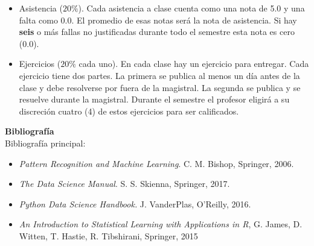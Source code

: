 \documentclass[letterpaper,10pt,onecolumn]{article}
\begin{document}
\begin{itemize}
\item Asistencia ($20\%$). Cada asistencia a clase cuenta como una
  nota de 5.0 y una falta como 0.0. El promedio de esas notas ser\'a
  la nota de asistencia. 
  Si hay {\bf seis} o m\'as fallas no justificadas durante todo el
  semestre esta nota es cero (0.0).
\item Ejercicios ($20\%$ cada uno). En cada clase hay un ejercicio para
  entregar. Cada ejercicio tiene dos partes. 
  La primera se publica al menos un d\'ia antes de la clase y debe
  resolverse por fuera de la magistral. 
  La segunda se publica y se resuelve durante la magistral.
  Durante el semestre el profesor eligir\'a a su discreci\'on cuatro (4)
  de estos ejercicios para ser calificados. 
\end{itemize}

\vspace*{0.5cm} 

\noindent\textbf{\large {} \quad
  Bibliograf\'ia}\\[-0.2cm] 



\noindent\normalsize Bibliograf\'ia principal:

\begin{itemize}


\item
\textit{Pattern Recognition and Machine Learning}. C. M. Bishop, 
Springer, 2006.\\[-0.6cm]

\item 
\textit{The Data Science Manual}. S. S. Skienna, Springer, 2017.\\[-0.6cm]

\item
\textit{Python Data Science Handbook.} J. VanderPlas, O'Reilly, 2016.\\[-0.6cm]

\item 
\textit{An Introduction to Statistical Learning with Applications in
  R}, G. James, D. Witten, T. Hastie, R. Tibshirani, Springer, 2015 \\[-0.6cm]
\end{itemize}
\end{document}
